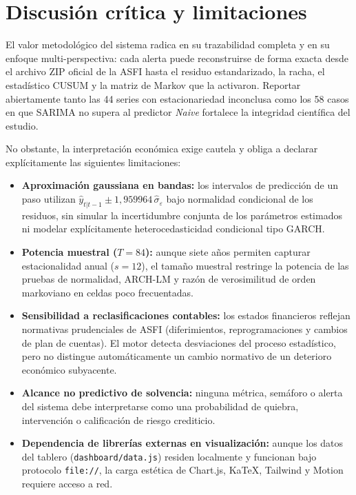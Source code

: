 \documentclass[11pt,letterpaper]{article}
\begin{document}
\section{Discusión crítica y limitaciones}

El valor metodológico del sistema radica en su trazabilidad completa y en su enfoque multi-perspectiva: cada alerta puede reconstruirse de forma exacta desde el archivo ZIP oficial de la ASFI hasta el residuo estandarizado, la racha, el estadístico CUSUM y la matriz de Markov que la activaron. Reportar abiertamente tanto las 44 series con estacionariedad inconclusa como los 58 casos en que SARIMA no supera al predictor \emph{Naive} fortalece la integridad científica del estudio.

No obstante, la interpretación económica exige cautela y obliga a declarar explícitamente las siguientes limitaciones:
\begin{itemize}[leftmargin=1.5em]
  \item \textbf{Aproximación gaussiana en bandas:} los intervalos de predicción de un paso utilizan \(\hat{y}_{t|t-1} \pm 1{,}959964\,\hat{\sigma}_\varepsilon\) bajo normalidad condicional de los residuos, sin simular la incertidumbre conjunta de los parámetros estimados ni modelar explícitamente heterocedasticidad condicional tipo GARCH.
  \item \textbf{Potencia muestral (\(T = 84\)):} aunque siete años permiten capturar estacionalidad anual (\(s = 12\)), el tamaño muestral restringe la potencia de las pruebas de normalidad, ARCH-LM y razón de verosimilitud de orden markoviano en celdas poco frecuentadas.
  \item \textbf{Sensibilidad a reclasificaciones contables:} los estados financieros reflejan normativas prudenciales de ASFI (diferimientos, reprogramaciones y cambios de plan de cuentas). El motor detecta desviaciones del proceso estadístico, pero no distingue automáticamente un cambio normativo de un deterioro económico subyacente.
  \item \textbf{Alcance no predictivo de solvencia:} ninguna métrica, semáforo o alerta del sistema debe interpretarse como una probabilidad de quiebra, intervención o calificación de riesgo crediticio.
  \item \textbf{Dependencia de librerías externas en visualización:} aunque los datos del tablero (\texttt{dashboard/data.js}) residen localmente y funcionan bajo protocolo \texttt{file://}, la carga estética de Chart.js, KaTeX, Tailwind y Motion requiere acceso a red.
\end{itemize}
\end{document}
